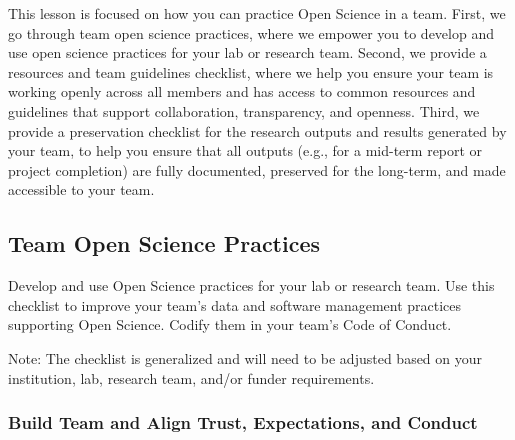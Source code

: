 \documentclass[
  letterpaper,
  DIV=11,
  numbers=noendperiod]{scrreport}
\begin{document}
This lesson is focused on how you can practice Open Science in a team.
First, we go through team open science practices, where we empower you
to develop and use open science practices for your lab or research team.
Second, we provide a resources and team guidelines checklist, where we
help you ensure your team is working openly across all members and has
access to common resources and guidelines that support collaboration,
transparency, and openness. Third, we provide a preservation checklist
for the research outputs and results generated by your team, to help you
ensure that all outputs (e.g., for a mid-term report or project
completion) are fully documented, preserved for the long-term, and made
accessible to your team.

\hypertarget{team-open-science-practices}{%
\subsection{Team Open Science
Practices}\label{team-open-science-practices}}

Develop and use Open Science practices for your lab or research team.
Use this checklist to improve your team's data and software management
practices supporting Open Science. Codify them in your team's Code of
Conduct.

Note: The checklist is generalized and will need to be adjusted based on
your institution, lab, research team, and/or funder requirements.

\hypertarget{build-team-and-align-trust-expectations-and-conduct}{%
\subsubsection{Build Team and Align Trust, Expectations, and
Conduct}\label{build-team-and-align-trust-expectations-and-conduct}}
\end{document}
